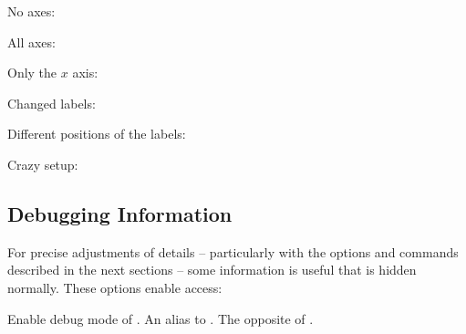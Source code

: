 \documentclass[load-preamble+]{cnltx-doc}
\begin{document}
No axes:
\begin{example}
  \begin{endiagram}[axes=false]
  \end{endiagram}
\end{example}

All axes:
\begin{example}
  \begin{endiagram}[axes=all]
  \end{endiagram}
\end{example}

Only the $x$ axis:
\begin{example}
  \begin{endiagram}[axes=x]
  \end{endiagram}
\end{example}

Changed labels:
\begin{example}
  \begin{endiagram}[x-label-text=\footnotesize reaction coordinate]
  \end{endiagram}
\end{example}

Different positions of the labels:
\begin{example}
  \begin{endiagram}[
     x-label=right,
     y-label=above]
  \end{endiagram}
  \quad
  \begin{endiagram}[
     x-label-pos=.7,
     y-label-pos=.7,
     y-label-angle=-90,
     y-label-offset=5pt]
  \end{endiagram}
\end{example}

Crazy setup:
\begin{example}
  \begin{endiagram}[x-axis={draw=blue,dashed,font=\color{green}}]
  \end{endiagram}
\end{example}

\subsection{Debugging Information}

For precise adjustments of details -- particularly with the options and
commands described in the next sections -- some information is useful that is
hidden normally.  These options enable access:
\begin{options}
    Enable debug mode of \ENdiagram. \label{key:debug}
    An alias to .
    The opposite of .
\end{options}
\end{document}
